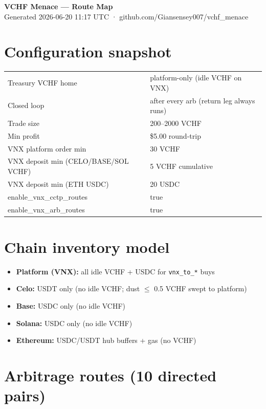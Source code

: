 \documentclass[11pt,a4paper]{article}
\begin{document}
\begin{center}
{\LARGE\bfseries\color{accent} VCHF Menace --- Route Map}\\[6pt]
{\color{muted}\small Generated 2026-06-20 11:17 UTC · github.com/Giansensey007/vchf\_menace}\\[12pt]
\end{center}
\section*{Configuration snapshot}
\begin{tabular}{@{}ll@{}}
Treasury VCHF home & platform-only (idle VCHF on VNX) \\
Closed loop & after every arb (return leg always runs) \\
Trade size & 200--2000 VCHF \\
Min profit & \$5.00 round-trip \\
VNX platform order min & 30 VCHF \\
VNX deposit min (CELO/BASE/SOL VCHF) & 5 VCHF cumulative \\
VNX deposit min (ETH USDC) & 20 USDC \\
enable\_vnx\_cctp\_routes & true \\
enable\_vnx\_arb\_routes & true \\
\end{tabular}
\section*{Chain inventory model}
\begin{itemize}[nosep]
\item \textbf{Platform (VNX):} all idle VCHF + USDC for \texttt{vnx\_to\_*} buys
\item \textbf{Celo:} USDT only (no idle VCHF; dust $\leq$ 0.5 VCHF swept to platform)
\item \textbf{Base:} USDC only (no idle VCHF)
\item \textbf{Solana:} USDC only (no idle VCHF)
\item \textbf{Ethereum:} USDC/USDT hub buffers + gas (no VCHF)
\end{itemize}
\section*{Arbitrage routes (10 directed pairs)}
\end{document}
